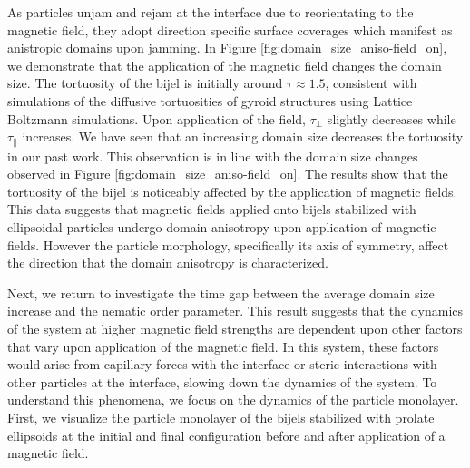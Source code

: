 As particles unjam and rejam at the interface due to reorientating to the magnetic field, they adopt direction specific surface coverages
which manifest as anistropic domains upon jamming. In Figure \ref{fig:domain_size_aniso-field_on}, we demonstrate that the
application of the magnetic field changes the domain size. The tortuosity of the bijel is initially around $\tau \approx 1.5$,
consistent with simulations of the diffusive tortuosities of gyroid structures using Lattice Boltzmann simulations.
\cite{luo_macroscopic_2020} Upon application of the field, $\tau_{\perp}$ slightly decreases while $\tau_{\parallel}$
increases. We have seen that an increasing domain size decreases the tortuosity in our past work. \cite{karthikeyan_formation_2024} This
observation is in line with the domain size changes observed in Figure \ref{fig:domain_size_aniso-field_on}. The results show that the
tortuosity of the bijel is noticeably affected by the application of magnetic fields. This data suggests that magnetic fields applied onto
bijels stabilized with ellipsoidal particles undergo domain anisotropy upon application of magnetic fields. However the particle morphology,
specifically its axis of symmetry, affect the direction that the domain anisotropy is characterized.

Next, we return to investigate the time gap between the average domain size increase and the nematic order parameter. This result suggests that the dynamics 
of the system at higher magnetic field strengths are dependent upon other factors that vary upon application of the magnetic field. In this system, these factors
would arise from capillary forces with the interface or steric interactions with other particles at the interface, slowing down the dynamics of the system.
To understand this phenomena, we focus on the dynamics of the particle monolayer. First, we visualize the particle monolayer of the bijels stabilized with prolate 
ellipsoids at the initial and final configuration before and after application of a magnetic field.

